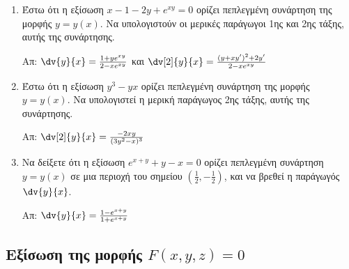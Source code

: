 \begin{enumerate}
    \item Έστω ότι η εξίσωση $ x-1-2y+e^{xy} = 0 $ ορίζει πεπλεγμένη συνάρτηση της 
        μορφής $ y = y(x) $. Να υπολογιστούν οι μερικές παράγωγοι 
        1ης και 2ης τάξης, αυτής της συνάρτησης.

        \hfill Απ: $ \dv{y}{x} = \frac{1+ye^{xy}}{2-xe^{xy}} $ και $ \dv[2]{y}{x}
        = \frac{(y+xy')^{2}+2y'}{2-xe^{xy}} $ 

    \item Έστω ότι η εξίσωση $ y^{3} - yx $ ορίζει πεπλεγμένη συνάρτηση της 
        μορφής $ y = y(x) $. Να υπολογιστεί η μερική παράγωγος 2ης τάξης, αυτής 
        της συνάρτησης.

        \hfill Απ: $ \dv[2]{y}{x} = \frac{ -2xy }{ (3y^{2} - x)^{3} }  $ 

    \item Να δείξετε ότι η εξίσωση $ e^{x+y} + y- x = 0 $ ορίζει πεπλεγμένη συνάρτηση 
        $ y=y(x) $ σε μια περιοχή του σημείου $ \left(\frac{1}{2}, - 
        \frac{1}{2}\right) $, και να βρεθεί η παράγωγός $ \dv{y}{x} $.

        \hfill Απ: $ \dv{y}{x} = \frac{1-e^{x+y}}{1+e^{x+y}} $  
\end{enumerate}

\subsection*{Εξίσωση της μορφής \ensuremath{F(x,y,z)=0}}

